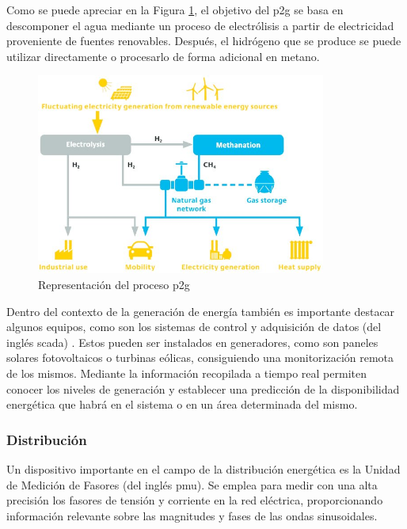 \vspace{3mm}

Como se puede apreciar en la Figura \ref{fig:p2g}, el objetivo del \gls{p2g} se basa en descomponer el agua mediante un proceso de electrólisis a partir de electricidad proveniente de fuentes renovables. Después, el hidrógeno que se produce se puede utilizar directamente o procesarlo de forma adicional en metano. 

\begin{figure}[h!]
  \centering
  \includegraphics[width=0.85\textwidth]{img/teoria/p2g.jpg}
  \caption{Representación del proceso \gls{p2g} \cite{p2g}}
  \label{fig:p2g}
\end{figure}

Dentro del contexto de la generación de energía también es importante destacar algunos equipos, como son los sistemas de control y adquisición de datos (del inglés \gls{scada}) \cite{scada}. Estos pueden ser instalados en generadores, como son paneles solares fotovoltaicos o turbinas eólicas, consiguiendo una monitorización remota de los mismos. Mediante la información recopilada a tiempo real permiten conocer los niveles de generación y establecer una predicción de la disponibilidad energética que habrá en el sistema o en un área determinada del mismo.

\vspace{3mm}

\subsubsection{Distribución}

Un dispositivo importante en el campo de la distribución energética es la Unidad de Medición de Fasores (del inglés \gls{pmu}). Se emplea para medir con una alta precisión los fasores de tensión y corriente en la red eléctrica, proporcionando información relevante sobre las magnitudes y fases de las ondas sinusoidales. 


